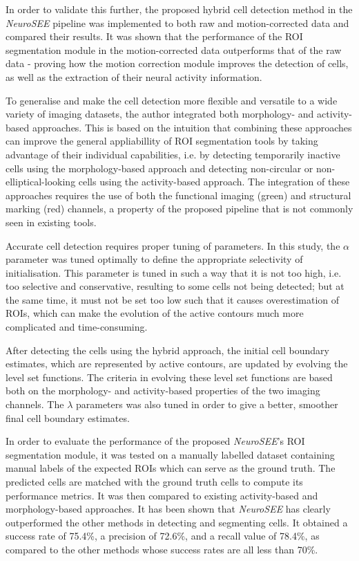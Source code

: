 In order to validate this further, the proposed hybrid cell detection method in the \textit{NeuroSEE} pipeline was implemented to both raw and motion-corrected data and compared their results. It was shown that the performance of the ROI segmentation module in the motion-corrected data outperforms that of the raw data - proving how the motion correction module improves the detection of cells, as well as the extraction of their neural activity information.

To generalise and make the cell detection more flexible and versatile to a wide variety of imaging datasets, the author integrated both morphology- and activity-based approaches. This is based on the intuition that combining these approaches can improve the general appliabillity of ROI segmentation tools by taking advantage of their individual capabilities, i.e. by detecting temporarily inactive cells using the morphology-based approach and detecting non-circular or non-elliptical-looking cells using the activity-based approach. The integration of these approaches requires the use of both the functional imaging (green) and structural marking (red) channels, a property of the proposed pipeline that is not commonly seen in existing tools. 

Accurate cell detection requires proper tuning of parameters. In this study, the $\alpha$ parameter was tuned optimally to define the appropriate selectivity of initialisation. This parameter is tuned in such a way that it is not too high, i.e. too selective and conservative, resulting to some cells not being detected; but at the same time, it must not be set too low such that it causes overestimation of ROIs, which can make the evolution of the active contours much more complicated and time-consuming. 

After detecting the cells using the hybrid approach, the initial cell boundary estimates, which are represented by active contours, are updated by evolving the level set functions. The criteria in evolving these level set functions are based both on the morphology- and activity-based properties of the two imaging channels. The $\lambda$ parameters was also tuned in order to give a better, smoother final cell boundary estimates. 

In order to evaluate the performance of the proposed \textit{NeuroSEE}'s ROI segmentation module, it was tested on a manually labelled dataset containing manual labels of the expected ROIs which can serve as the ground truth. The predicted cells are matched with the ground truth cells to compute its performance metrics. It was then compared to existing activity-based and morphology-based approaches. It has been shown that \textit{NeuroSEE} has clearly outperformed the other methods in detecting and segmenting cells. It obtained a success rate of 75.4\%, a precision of 72.6\%, and a recall value of 78.4\%, as compared to the other methods whose success rates are all less than 70\%. 

